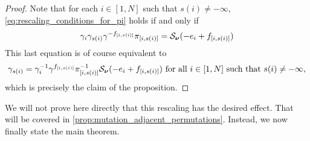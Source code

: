 \begin{proof}

	Note that for each $i \in [1, N]$ such that $s(i) \neq -\infty$,
	\cref{eq:rescaling_conditions_for_pi} holds if and only if
	\begin{equation*}
		\gamma_i \gamma_{s(i)} \gamma^{-f_{[i, s(i)]}}\pi_{[i, s(i)]} = \mathcal{S}_{\boldsymbol{\nu}}(-e_i + f_{[i, s(i)]})
	\end{equation*}
	This last equation is of course equivalent to
	\begin{equation*}
		\gamma_{s(i)} =  \gamma_{i}^{-1} \gamma^{f_{[i, s(i)]}}\pi_{[i, s(i)]}^{-1} \mathcal{S}_{\boldsymbol{\nu}}(-e_i + f_{[i, s(i)]}) \text{ for all } i \in [1, N] \text{ such that } s(i) \neq -\infty,
	\end{equation*}
	which is precisely the claim of the proposition.
\end{proof}

We will not prove here directly that this rescaling has the desired effect. That will
be covered in \cref{prop:mutation_adjacent_permutations}. Instead, we now finally state
the main theorem.

